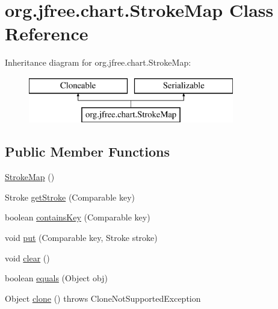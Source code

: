 \hypertarget{classorg_1_1jfree_1_1chart_1_1_stroke_map}{}\section{org.\+jfree.\+chart.\+Stroke\+Map Class Reference}
\label{classorg_1_1jfree_1_1chart_1_1_stroke_map}
Inheritance diagram for org.\+jfree.\+chart.\+Stroke\+Map\+:\begin{figure}[H]
\begin{center}
\leavevmode
\includegraphics[height=2.000000cm]{classorg_1_1jfree_1_1chart_1_1_stroke_map}
\end{center}
\end{figure}
\subsection*{Public Member Functions}
\begin{DoxyCompactItemize}
\item 
\mbox{\hyperlink{classorg_1_1jfree_1_1chart_1_1_stroke_map_a60c6945cdf4cc6e625e03711f4bf5990}{Stroke\+Map}} ()
\item 
Stroke \mbox{\hyperlink{classorg_1_1jfree_1_1chart_1_1_stroke_map_acf04326867255702582527490cb6d494}{get\+Stroke}} (Comparable key)
\item 
boolean \mbox{\hyperlink{classorg_1_1jfree_1_1chart_1_1_stroke_map_a2a3f1c8eb5c1f2698c391e61c30bf45e}{contains\+Key}} (Comparable key)
\item 
void \mbox{\hyperlink{classorg_1_1jfree_1_1chart_1_1_stroke_map_a3863598bc78bd8ecad71744d25ec5f6a}{put}} (Comparable key, Stroke stroke)
\item 
void \mbox{\hyperlink{classorg_1_1jfree_1_1chart_1_1_stroke_map_aff7c16c1469546634e06de218cffbc83}{clear}} ()
\item 
boolean \mbox{\hyperlink{classorg_1_1jfree_1_1chart_1_1_stroke_map_a8ec059fe5a43e0fb9cd65f7bcfdf6add}{equals}} (Object obj)
\item 
Object \mbox{\hyperlink{classorg_1_1jfree_1_1chart_1_1_stroke_map_a0eeae03ad56a15ecb901fd6207271a33}{clone}} ()  throws Clone\+Not\+Supported\+Exception 
\end{DoxyCompactItemize}


